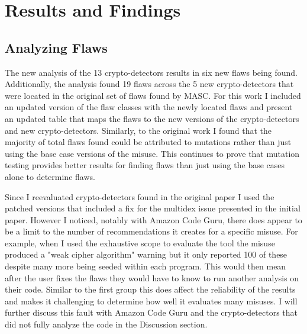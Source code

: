 \chapter{Results and Findings}
\label{chap_results}

\section{Analyzing Flaws}
\label{ch5:sec:flaws}

\begin{sloppypar}
%
\end{sloppypar}


The new analysis of the 13 crypto-detectors results in six new flaws being found. Additionally, the analysis found 19 flaws across the 5 new crypto-detectors that were located in the original set of flaws found by MASC. For this work I included an updated version of the flaw classes with the newly located flaws and present an updated table that maps the flaws to the new versions of the crypto-detectors and new crypto-detectors. Similarly, to the original work I found that the majority of total flaws found could be attributed to mutations rather than just using the base case versions of the misuse. This continues to prove that mutation testing provides better results for finding flaws than just using the base cases alone to determine flaws.

Since I reevaluated crypto-detectors found in the original paper I used the patched versions that included a fix for the multidex issue presented in the initial paper. However I noticed, notably with Amazon Code Guru, there does appear to be a limit to the number of recommendations it creates for a specific misuse. For example, when I used the exhaustive scope to evaluate the tool the misuse produced a "weak cipher algorithm" warning but it only reported 100 of these despite many more being seeded within each program. This would then mean after the user fixes the flaws they would have to know to run another analysis on their code. Similar to the first group this does affect the reliability of the results and makes it challenging to determine how well it evaluates many misuses. I will further discuss this fault with Amazon Code Guru and the crypto-detectors that did not fully analyze the code in the Discussion section. 

